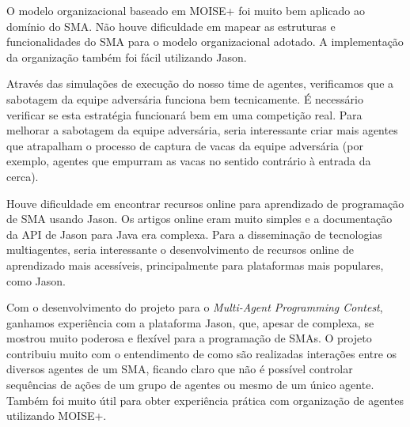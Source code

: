 \documentclass{llncs}
\begin{document}
O modelo organizacional baseado em MOISE+ foi muito bem aplicado ao domínio do SMA. Não houve dificuldade em mapear as estruturas e funcionalidades do SMA para o modelo organizacional adotado. A implementação da organização também foi fácil utilizando Jason.


Através das simulações de execução do nosso time de agentes, verificamos que a sabotagem da equipe adversária funciona bem tecnicamente. É necessário verificar se esta estratégia funcionará bem em uma competição real. Para melhorar a sabotagem da equipe adversária, seria interessante criar mais agentes que atrapalham o processo de captura de vacas da equipe adversária (por exemplo, agentes que empurram as vacas no sentido contrário à entrada da cerca).

Houve dificuldade em encontrar recursos online para aprendizado de programação de SMA usando Jason. Os artigos online eram muito simples e a documentação da API de Jason para Java era complexa. Para a disseminação de tecnologias multiagentes, seria interessante o desenvolvimento de recursos online de aprendizado mais acessíveis, principalmente para plataformas mais populares, como Jason.

Com o desenvolvimento do projeto para o \textit{Multi-Agent Programming Contest}, ganhamos experiência com a plataforma Jason, que, apesar de complexa, se mostrou muito poderosa e flexível para a programação de SMAs. O projeto contribuiu muito com o entendimento de como são realizadas interações entre os diversos agentes de um SMA, ficando claro que não é possível controlar sequências de ações de um grupo de agentes ou mesmo de um único agente. Também foi muito útil para obter experiência prática com organização de agentes utilizando MOISE+.



\end{document}
